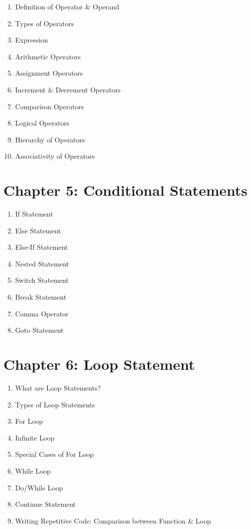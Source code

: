 \documentclass[a4paper,11pt]{article}
\begin{document}
	\begin{enumerate}
		\item Definition of Operator \& Operand
		\item Types of Operators
		\item Expression
		\item Arithmetic Operators
		\item Assignment Operators
		\item Increment \& Decrement Operators
		\item Comparison Operators
		\item Logical Operators
		\item Hierarchy of Operators
		\item Associativity of Operators
	\end{enumerate}


	\section*{ Chapter 5: Conditional Statements }

	\begin{enumerate}
		\item If Statement
		\item Else Statement
		\item Else-If Statement
		\item Nested Statement
		\item Switch Statement
		\item Break Statement
		\item Comma Operator
		\item Goto Statement
	\end{enumerate}


	\section*{ Chapter 6: Loop Statement }

	\begin{enumerate}
		\item What are Loop Statements?
		\item Types of Loop Statements
		\item For Loop
		\item Infinite Loop
		\item Special Cases of For Loop
		\item While Loop
		\item Do/While Loop
		\item Continue Statement
		\item Writing Repetitive Code: Comparison between Function \& Loop
	\end{enumerate}
\end{document}
